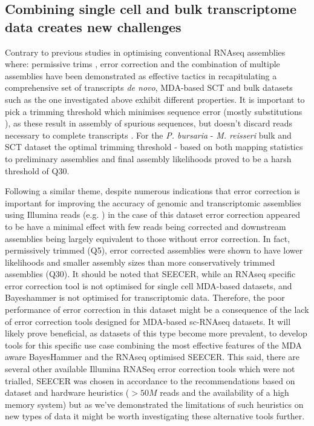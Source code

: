 \subsection{Combining single cell and bulk transcriptome data creates new challenges}

Contrary to previous studies in optimising conventional RNAseq assemblies where:
permissive trims \citep{Macmanes2014}, error correction \citep{Macmanes2013,Macmanes2015} and the combination of multiple assemblies
\citep{Nakasugi2014} have been demonstrated as effective tactics in recapitulating a comprehensive
set of transcripts \textit{de novo}, MDA-based SCT and bulk datasets such as the one investigated
above exhibit different properties.  
It is important to pick a trimming threshold which minimises sequence error (mostly substitutions \citep{Yang2013}),
as these result in assembly of spurious sequences, but doesn't discard reads necessary to complete transcripts \citep{Macmanes2013,Macmanes2014}. 
For the \textit{P. bursaria} - \textit{M. reisseri} bulk and SCT dataset the optimal trimming threshold - based on both
mapping statistics to preliminary assemblies and final assembly likelihoods proved to be a harsh threshold of Q30. 

Following a similar theme, despite numerous indications that error correction is important for improving the accuracy
of genomic and transcriptomic assemblies using Illumina reads (e.g. \citep{Molnar2014,Macmanes2015}) 
in the case of this dataset error correction appeared to be have a minimal effect with few
reads being corrected and downstream assemblies being largely equivalent to those
without error correction.  In fact, permissively trimmed (Q5), error corrected assemblies 
were shown to have lower likelihoods and smaller assembly sizes
than more conservatively trimmed assemblies (Q30).
It should be noted that SEECER, while an RNAseq specific error correction tool is not
optimised for single cell MDA-based datasets, and Bayeshammer is not optimised
for transcriptomic data.  Therefore, the poor performance of error correction
in this dataset might be a consequence of the lack of error correction tools
designed for MDA-based sc-RNAseq datasets. It will likely prove beneficial, as 
datasets of this type become more prevalent, to develop tools for this specific
use case combining the most effective features of the MDA aware BayesHammer 
and the RNAseq optimised SEECER.  This said, there are several other available 
Illumina RNASeq error correction tools 
which were not trialled, SEECER was chosen in accordance to the recommendations based on dataset and hardware
heuristics (\(>50M\) reads and the availability of a high memory system) \citep{Macmanes2015} but
as we've demonstrated the limitations of such heuristics on new types of data it might 
be worth investigating these alternative tools further.

